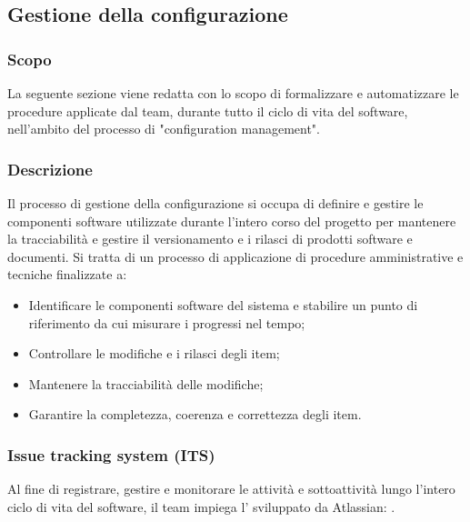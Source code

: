 \subsection{Gestione della configurazione}\label{gestione-configurazione}

\subsubsection{Scopo}
\par La seguente sezione viene redatta con lo scopo di formalizzare e automatizzare le procedure applicate dal team, durante tutto il ciclo di vita del software, nell'ambito del processo di "configuration management".

\subsubsection{Descrizione}
\par Il processo di gestione della configurazione si occupa di definire e gestire le componenti software utilizzate durante l'intero corso del progetto per mantenere la tracciabilità e gestire il versionamento e i rilasci di prodotti software e documenti. Si tratta di un processo di applicazione di procedure amministrative e tecniche finalizzate a:
\begin{itemize}
  \item Identificare le componenti software del sistema e stabilire un punto di riferimento da cui misurare i progressi nel tempo;
  \item Controllare le modifiche e i rilasci degli item;
  \item Mantenere la tracciabilità delle modifiche;
  \item Garantire la completezza, coerenza e correttezza degli item.
\end{itemize}

\subsubsection{Issue tracking system (ITS)}
\par Al fine di registrare, gestire e monitorare le attività e sottoattività lungo l'intero ciclo di vita del software, il team impiega l' sviluppato da Atlassian: .

